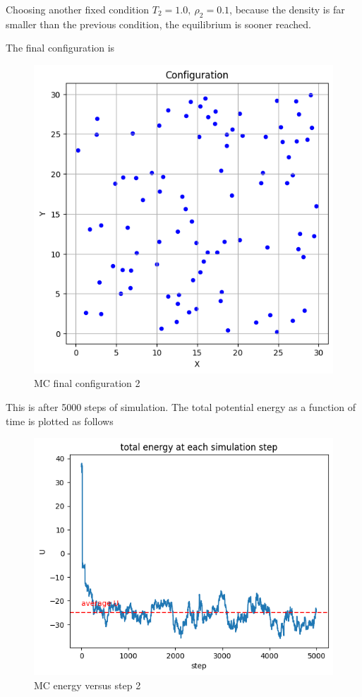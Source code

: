 \documentclass[letterpaper,12pt]{article}
\numberwithin{equation}{section}
\begin{document}
\begin{enumerate}[label=(\alph*)]
    Choosing another fixed condition $T_2=1.0,\ \rho_2=0.1$, because the density is far smaller than the previous condition, the equilibrium is sooner reached. 

    The final configuration is 
    \begin{figure}[H]
        \centering
        \includegraphics[width=.8\textwidth]{final_config_mc2.png}
        \caption{MC final configuration 2}
    \end{figure}
    This is after 5000 steps of simulation. The total potential energy as a function of time is plotted as follows
    \begin{figure}[H]
        \centering
        \includegraphics[width=.8\textwidth]{energy_to_time_mc2.png}
        \caption{MC energy versus step 2}

\end{figure}
\end{enumerate}
\end{document}
